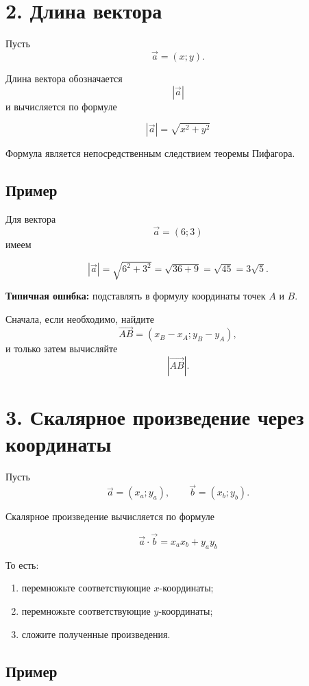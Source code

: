\documentclass[a4paper,12pt]{article}
\newcommand{\vect}[1]{\overrightarrow{#1}}
\newcommand{\dotprod}{\mathbin{\cdot}}
\begin{document}

\section*{\color{darkaccent}2. Длина вектора}

Пусть
\[
\vec a=(x;y).
\]

Длина вектора обозначается
\[
|\vec a|
\]
и вычисляется по формуле

\[
\boxed{
|\vec a|=\sqrt{x^2+y^2}
}
\]

Формула является непосредственным следствием теоремы Пифагора.

\subsection*{Пример}

Для вектора
\[
\vec a=(6;3)
\]
имеем

\[
|\vec a|
=
\sqrt{6^2+3^2}
=
\sqrt{36+9}
=
\sqrt{45}
=
3\sqrt5.
\]

\textbf{Типичная ошибка:}
подставлять в формулу координаты точек \(A\) и \(B\).

Сначала, если необходимо, найдите
\[
\vect{AB}=(x_B-x_A;y_B-y_A),
\]
и только затем вычисляйте
\[
|\vect{AB}|.
\]


\section*{\color{darkaccent}3. Скалярное произведение через координаты}

Пусть
\[
\vec a=(x_a;y_a),
\qquad
\vec b=(x_b;y_b).
\]

Скалярное произведение вычисляется по формуле

\[
\boxed{
\vec a\dotprod\vec b
=
x_a x_b+y_a y_b
}
\]

То есть:

\begin{enumerate}
    \item перемножьте соответствующие \(x\)-координаты;
    \item перемножьте соответствующие \(y\)-координаты;
    \item сложите полученные произведения.
\end{enumerate}

\subsection*{Пример}
\end{document}
